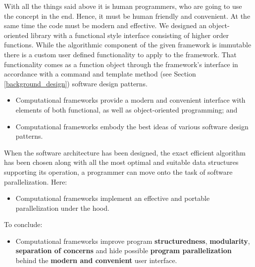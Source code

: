 \quad With all the things said above it is human programmers, who are going to use the concept in the end. Hence, it must be human friendly and convenient. At the same time the code must be modern and effective. We designed an object-oriented library with a functional style interface consisting of higher order functions. While the algorithmic component of the given framework is immutable there is a custom user defined functionality to apply to the framework. That functionality comes as a function object through the framework's interface in accordance with a command and template method (see Section \ref{background_design}) software design patterns. 
\begin{itemize}[style=unboxed,leftmargin=0cm]
\itemsep0em
\renewcommand\labelitemi{$\vartriangleright$}
\renewcommand\labelitemii{$\bullet$}
\item Computational frameworks provide a modern and convenient interface with elements of both functional, as well as object-oriented programming; and
\item Computational frameworks embody the best ideas of various software design patterns. 
\end{itemize}
\quad When the software architecture has been designed, the exact efficient algorithm has been chosen along with all the most optimal and suitable data structures supporting its operation, a programmer can move onto the task of software parallelization. Here:  
\begin{itemize}[style=unboxed,leftmargin=0cm]
\itemsep0em
\renewcommand\labelitemi{$\vartriangleright$}
\renewcommand\labelitemii{$\bullet$}
\item Computational frameworks implement an effective and portable parallelization under the hood.
\end{itemize}
\quad To conclude:
\begin{itemize}[style=unboxed,leftmargin=0cm]
\itemsep0em
\renewcommand\labelitemi{$\vartriangleright$}
\renewcommand\labelitemii{$\bullet$}
\item Computational frameworks improve program \textbf{structuredness}, \textbf{modularity}, \textbf{separation of concerns} and hide possible \textbf{program parallelization} behind the \textbf{modern and convenient} user interface. 
\end{itemize}
